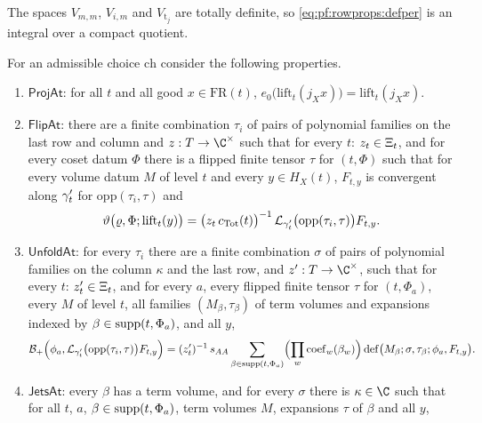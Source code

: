 The spaces $V_{m,m}$, $V_{i,m}$ and $V_{\mathrm t_j}$ are totally definite, so \eqref{eq:pf:rowprops:defper} is an integral
over a compact quotient.

\begin{definition}\label{def:pf:rowprops:steps}
For an admissible choice $\mathrm{ch}$ consider the following properties.
\begin{enumerate}[label=(\alph*)]
\item $\mathsf{ProjAt}$: for all $t$ and all good $x\in\mathrm{FR}(t)$, $e_0\bigl(\mathrm{lift}_t(j_Xx)\bigr)=\mathrm{lift}_t(j_Xx)$.
\item $\mathsf{FlipAt}$: there are a finite combination $\tau_i$ of pairs of polynomial families on the last row and
column and $z:T\to\C^\times$ such that for every $t$: $z_t\in\Xi_t$, and for every coset datum $\Phi$ there is a
flipped finite tensor $\tau$ for $(t,\Phi)$ such that for every volume datum $M$ of level $t$ and every $y\in H_X(t)$,
$F_{t,y}$ is convergent along $\gamma'_t$ for $\mathrm{opp}(\tau_i,\tau)$ and
\begin{equation}\label{eq:pf:rowprops:flipat}
\vartheta\bigl(\varrho,\Phi;\mathrm{lift}_t(y)\bigr)=\bigl(z_t\,c_{\mathrm{Tot}}(t)\bigr)^{-1}\,
\mathcal{L}_{\gamma'_t}\bigl(\mathrm{opp}(\tau_i,\tau)\bigr)F_{t,y}.
\end{equation}
\item $\mathsf{UnfoldAt}$: for every $\tau_i$ there are a finite combination $\sigma$ of pairs of polynomial families on the
column $\kappa$ and the last row, and $z':T\to\C^\times$, such that for every $t$: $z'_t\in\Xi_t$, and for every $a$,
every flipped finite tensor $\tau$ for $(t,\Phi_a)$, every $M$ of level $t$, all families $(M_\beta,\tau_\beta)$ of term
volumes and expansions indexed by $\beta\in\mathrm{supp}(t,\Phi_a)$, and all $y$,
\begin{equation}\label{eq:pf:rowprops:unfoldat}
\mathcal{B}_+\Bigl(\phi_a,\mathcal{L}_{\gamma'_t}\bigl(\mathrm{opp}(\tau_i,\tau)\bigr)F_{t,y}\Bigr)=
(z'_t)^{-1}\,s_{AA}\sum_{\beta\in\mathrm{supp}(t,\Phi_a)}\Bigl(\prod_w\mathrm{coef}_w(\beta_w)\Bigr)\,
\mathrm{def}\bigl(M_\beta;\sigma,\tau_\beta;\phi_a,F_{t,y}\bigr).
\end{equation}
\item $\mathsf{JetsAt}$: every $\beta$ has a term volume, and for every $\sigma$ there is $\kappa\in\C$ such that for all
$t$, $a$, $\beta\in\mathrm{supp}(t,\Phi_a)$, term volumes $M$, expansions $\tau$ of $\beta$ and all $y$,
\begin{equation}\label{eq:pf:rowprops:jetsat}

\end{equation}
\end{enumerate}
\end{definition}
